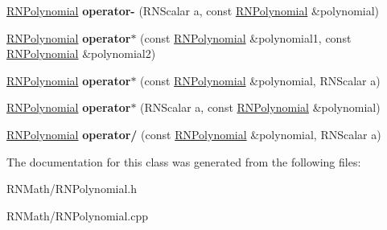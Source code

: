 \begin{DoxyCompactItemize}
\item 
\hyperlink{class_r_n_polynomial}{R\+N\+Polynomial} {\bfseries operator-\/} (R\+N\+Scalar a, const \hyperlink{class_r_n_polynomial}{R\+N\+Polynomial} \&polynomial)\hypertarget{class_r_n_polynomial_aa7d11f0a498a2c85d0d8889fc05db11b}{}\label{class_r_n_polynomial_aa7d11f0a498a2c85d0d8889fc05db11b}

\item 
\hyperlink{class_r_n_polynomial}{R\+N\+Polynomial} {\bfseries operator$\ast$} (const \hyperlink{class_r_n_polynomial}{R\+N\+Polynomial} \&polynomial1, const \hyperlink{class_r_n_polynomial}{R\+N\+Polynomial} \&polynomial2)\hypertarget{class_r_n_polynomial_a9cd194e3089e0698029d220c8addfbc5}{}\label{class_r_n_polynomial_a9cd194e3089e0698029d220c8addfbc5}

\item 
\hyperlink{class_r_n_polynomial}{R\+N\+Polynomial} {\bfseries operator$\ast$} (const \hyperlink{class_r_n_polynomial}{R\+N\+Polynomial} \&polynomial, R\+N\+Scalar a)\hypertarget{class_r_n_polynomial_a1416f9fea998a706c23a8e30477fe6a5}{}\label{class_r_n_polynomial_a1416f9fea998a706c23a8e30477fe6a5}

\item 
\hyperlink{class_r_n_polynomial}{R\+N\+Polynomial} {\bfseries operator$\ast$} (R\+N\+Scalar a, const \hyperlink{class_r_n_polynomial}{R\+N\+Polynomial} \&polynomial)\hypertarget{class_r_n_polynomial_aee4c3b449d13bd3533397db21a71e157}{}\label{class_r_n_polynomial_aee4c3b449d13bd3533397db21a71e157}

\item 
\hyperlink{class_r_n_polynomial}{R\+N\+Polynomial} {\bfseries operator/} (const \hyperlink{class_r_n_polynomial}{R\+N\+Polynomial} \&polynomial, R\+N\+Scalar a)\hypertarget{class_r_n_polynomial_a2a86dae18495887a81ffeb7f177ff8b1}{}\label{class_r_n_polynomial_a2a86dae18495887a81ffeb7f177ff8b1}

\end{DoxyCompactItemize}


The documentation for this class was generated from the following files\+:\begin{DoxyCompactItemize}
\item 
R\+N\+Math/R\+N\+Polynomial.\+h\item 
R\+N\+Math/R\+N\+Polynomial.\+cpp\end{DoxyCompactItemize}
